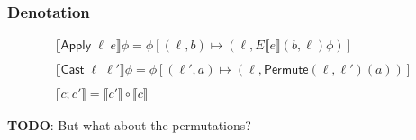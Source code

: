 \documentclass[runningheads]{llncs}
\newcommand {\sem} [1] {\llbracket #1 \rrbracket}
\newcommand {\Esem} [1] {E\sem{#1}}
\newcommand {\Apply} {\textsf{Apply}}
\newcommand {\Cast} {\textsf{Cast}}
\newcommand {\Permute} {\textsf{Permute}}
\begin{document}
\subsubsection{Denotation}

\[
  \begin{array}{c}
    \sem{\Apply\;\ell\;e}\phi = \phi[(\ell, b) \mapsto
               (\ell, \Esem{e}(b, \ell)\phi)]\\\\
    \sem{\Cast\;\ell\;\ell'}\phi = \phi[(\ell', a) \mapsto (\ell, \Permute(\ell, \ell')(a))]\\\\
    \sem{c;c'} = \sem{c'} \circ \sem{c}
  \end{array}
\]

\textbf{TODO}: But what about the permutations?
\end{document}
